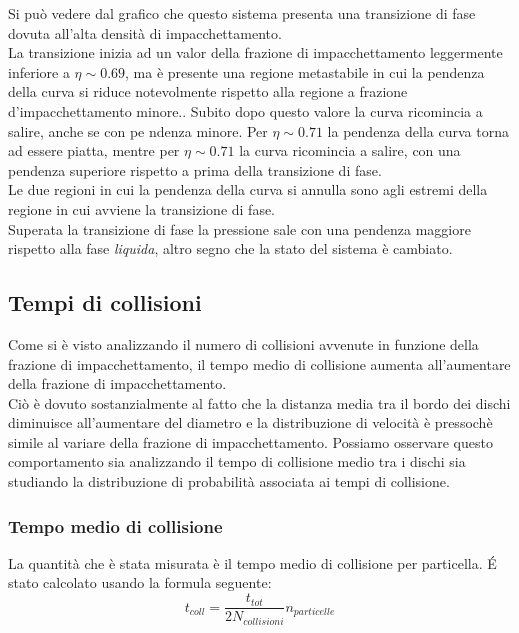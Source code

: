 Si può vedere dal grafico che questo sistema presenta una transizione di fase dovuta all'alta densità di impacchettamento.\\
La transizione inizia ad un valor della frazione di impacchettamento leggermente inferiore a $\eta \sim 0.69$, ma è presente una regione metastabile in cui la pendenza della curva si riduce notevolmente rispetto alla regione a frazione d'impacchettamento minore..
Subito dopo questo valore la curva ricomincia a salire, anche se con pe	ndenza minore.
Per $\eta \sim 0.71$ la pendenza della curva torna ad essere piatta, mentre per $\eta \sim 0.71$ la curva ricomincia a salire, con una pendenza superiore rispetto a prima della transizione di fase.\\
Le due regioni in cui la pendenza della curva si annulla sono agli estremi della regione in cui avviene la transizione di fase.\\
Superata la transizione di fase la pressione sale con una pendenza maggiore rispetto alla fase \emph{liquida}, altro segno che la stato del sistema è cambiato.



\subsection{Tempi di collisioni}

Come si è visto analizzando il numero di collisioni avvenute in funzione della frazione di impacchettamento, il tempo medio di collisione aumenta all'aumentare della frazione di impacchettamento.\\
Ciò è dovuto sostanzialmente al fatto che la distanza media tra il bordo dei dischi diminuisce all'aumentare del diametro e la distribuzione di velocità è pressochè simile al variare della frazione di impacchettamento.
Possiamo osservare questo comportamento sia analizzando il tempo di collisione medio tra i dischi sia studiando la distribuzione di probabilità associata ai tempi di collisione.\\

\subsubsection*{Tempo medio di collisione}
La quantità che è stata misurata è il tempo medio di collisione per particella. \'E stato calcolato usando la formula seguente:
$$
	t_{coll}  = \frac{t_{tot}}{2 N_{collisioni}} n_{particelle}
$$

